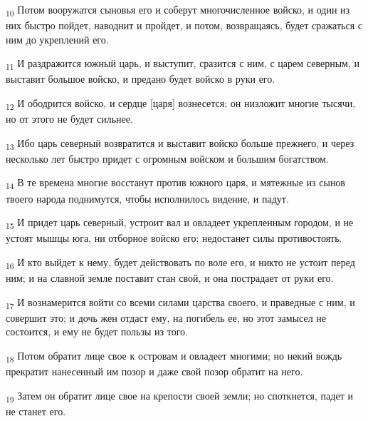 \begin{tcolorbox}
\textsubscript{10} Потом вооружатся сыновья его и соберут многочисленное войско, и один из них быстро пойдет, наводнит и пройдет, и потом, возвращаясь, будет сражаться с ним до укреплений его.
\end{tcolorbox}
\begin{tcolorbox}
\textsubscript{11} И раздражится южный царь, и выступит, сразится с ним, с царем северным, и выставит большое войско, и предано будет войско в руки его.
\end{tcolorbox}
\begin{tcolorbox}
\textsubscript{12} И ободрится войско, и сердце [царя] вознесется; он низложит многие тысячи, но от этого не будет сильнее.
\end{tcolorbox}
\begin{tcolorbox}
\textsubscript{13} Ибо царь северный возвратится и выставит войско больше прежнего, и через несколько лет быстро придет с огромным войском и большим богатством.
\end{tcolorbox}
\begin{tcolorbox}
\textsubscript{14} В те времена многие восстанут против южного царя, и мятежные из сынов твоего народа поднимутся, чтобы исполнилось видение, и падут.
\end{tcolorbox}
\begin{tcolorbox}
\textsubscript{15} И придет царь северный, устроит вал и овладеет укрепленным городом, и не устоят мышцы юга, ни отборное войско его; недостанет силы противостоять.
\end{tcolorbox}
\begin{tcolorbox}
\textsubscript{16} И кто выйдет к нему, будет действовать по воле его, и никто не устоит перед ним; и на славной земле поставит стан свой, и она пострадает от руки его.
\end{tcolorbox}
\begin{tcolorbox}
\textsubscript{17} И вознамерится войти со всеми силами царства своего, и праведные с ним, и совершит это; и дочь жен отдаст ему, на погибель ее, но этот замысел не состоится, и ему не будет пользы из того.
\end{tcolorbox}
\begin{tcolorbox}
\textsubscript{18} Потом обратит лице свое к островам и овладеет многими; но некий вождь прекратит нанесенный им позор и даже свой позор обратит на него.
\end{tcolorbox}
\begin{tcolorbox}
\textsubscript{19} Затем он обратит лице свое на крепости своей земли; но споткнется, падет и не станет его.
\end{tcolorbox}
